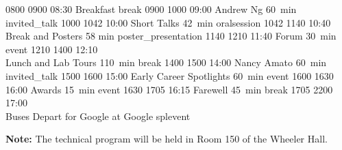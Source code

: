 \begin{timetable}
   {0800} {0900} {08:30 Breakfast}                      {}                            {}        {break}
   {0900} {1000} {09:00 Andrew Ng}                            {60~min}                           {}                      {invited_talk}
   {1000} {1042} {10:00 Short Talks}                          {\vspace{1.5mm}42~min}             {}        {oralsession}
   {1042} {1140} {10:40 Break and Posters}                    {\vspace{1.5mm}58 min}             {}      {poster_presentation}
   {1140} {1210} {11:40 Forum}                                {\vspace{1.5mm}30~min}             {}                      {event}
   {1210} {1400} {12:10\\[0.2em]Lunch and Lab Tours}          {110~min}                          {}                            {break}
   {1400} {1500} {14:00 Nancy Amato}                          {60~min}                           {}                      {invited_talk}
   {1500} {1600} {15:00 Early Career Spotlights} 	      {\vspace{1.5mm}60~min}             {}        {event}
   {1600} {1630} {16:00 Awards} 	              {\vspace{1.5mm}15~min}             {}        {event}
   {1630} {1705} {16:15 Farewell} 	              {\vspace{1.5mm}45~min}             {}        {break}
   {1705} {2200} {17:00\\\vspace{0.3em}Buses Depart for Google}     {}                              {at Google}     {splevent}
\end{timetable}

\begingroup
\large {\textbf{Note:} The technical program will be held in Room 150 of the Wheeler Hall.}
\endgroup




\begingroup %
\sffamily



